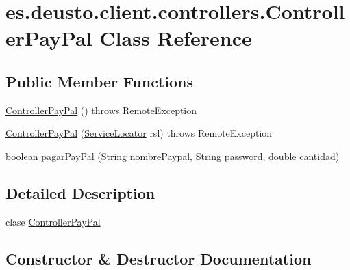 \hypertarget{classes_1_1deusto_1_1client_1_1controllers_1_1_controller_pay_pal}{}\section{es.\+deusto.\+client.\+controllers.\+Controller\+Pay\+Pal Class Reference}
\label{classes_1_1deusto_1_1client_1_1controllers_1_1_controller_pay_pal}
\subsection*{Public Member Functions}
\begin{DoxyCompactItemize}
\item 
\mbox{\hyperlink{classes_1_1deusto_1_1client_1_1controllers_1_1_controller_pay_pal_a49871de02f0c1249bd9c88de52ef1292}{Controller\+Pay\+Pal}} ()  throws Remote\+Exception 
\item 
\mbox{\hyperlink{classes_1_1deusto_1_1client_1_1controllers_1_1_controller_pay_pal_a45be65cb09058057fb47cf99277582d8}{Controller\+Pay\+Pal}} (\mbox{\hyperlink{classes_1_1deusto_1_1client_1_1remote_1_1_service_locator}{Service\+Locator}} rsl)  throws Remote\+Exception 
\item 
boolean \mbox{\hyperlink{classes_1_1deusto_1_1client_1_1controllers_1_1_controller_pay_pal_a4b0f77d9d997bd89bb8cc3b5e53c66bb}{pagar\+Pay\+Pal}} (String nombre\+Paypal, String password, double cantidad)
\end{DoxyCompactItemize}


\subsection{Detailed Description}
clase \mbox{\hyperlink{classes_1_1deusto_1_1client_1_1controllers_1_1_controller_pay_pal}{Controller\+Pay\+Pal}} 

\subsection{Constructor \& Destructor Documentation}
\mbox{\label{classes_1_1deusto_1_1client_1_1controllers_1_1_controller_pay_pal_a49871de02f0c1249bd9c88de52ef1292}} 
